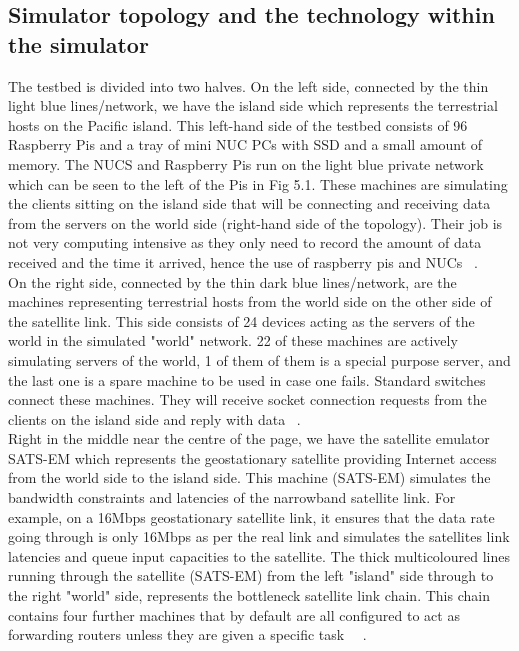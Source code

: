 \subsection{Simulator topology and the technology within the simulator}
The testbed is divided into two halves. On the left side, connected by the thin light blue lines/network, we have the island side which represents the terrestrial hosts on the Pacific island. This left-hand side of the testbed consists of 96 Raspberry Pis and a tray of mini NUC PCs with SSD and a small amount of memory. The NUCS and Raspberry Pis run on the light blue private network which can be seen to the left of the Pis in Fig 5.1. These machines are simulating the clients sitting on the island side that will be connecting and receiving data from the servers on the world side (right-hand side of the topology). Their job is not very computing intensive as they only need to record the amount of data received and the time it arrived, hence the use of raspberry pis and NUCs ~\cite{21}. \\

On the right side, connected by the thin dark blue lines/network, are the machines representing terrestrial hosts from the world side on the other side of the satellite link. This side consists of 24 devices acting as the servers of the world in the simulated "world" network. 22 of these machines are actively simulating servers of the world, 1 of them of them is a special purpose server, and the last one is a spare machine to be used in case one fails. Standard switches connect these machines. They will receive socket connection requests from the clients on the island side and reply with data ~\cite{21}. \\

Right in the middle near the centre of the page, we have the satellite emulator SATS-EM which represents the geostationary satellite providing Internet access from the world side to the island side. This machine (SATS-EM) simulates the bandwidth constraints and latencies of the narrowband satellite link. For example, on a 16Mbps geostationary satellite link, it ensures that the data rate going through is only 16Mbps as per the real link and simulates the satellites link latencies and queue input capacities to the satellite. The thick multicoloured lines running through the satellite (SATS-EM) from the left "island" side through to the right "world" side, represents the bottleneck satellite link chain. This chain contains four further machines that by default are all configured to act as forwarding routers unless they are given a specific task ~\cite{20}~\cite{21}.\\

